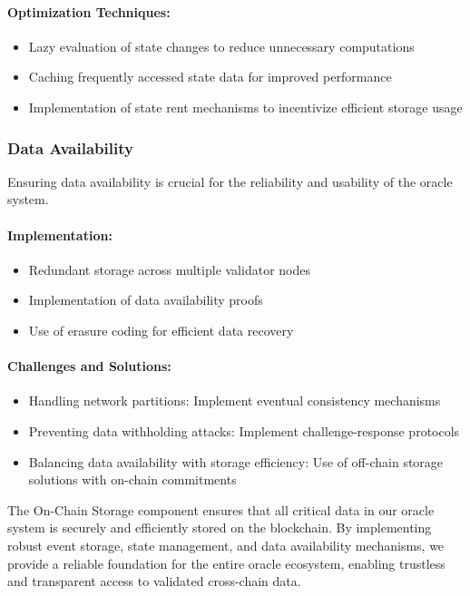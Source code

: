 \documentclass[12pt,a4paper]{article}
\begin{document}
	\paragraph{Optimization Techniques:}
	\begin{itemize}
		\item Lazy evaluation of state changes to reduce unnecessary computations
		\item Caching frequently accessed state data for improved performance
		\item Implementation of state rent mechanisms to incentivize efficient storage usage
	\end{itemize}
	
	\subsubsection{Data Availability}
	Ensuring data availability is crucial for the reliability and usability of the oracle system.
	
	\paragraph{Implementation:}
	\begin{itemize}
		\item Redundant storage across multiple validator nodes
		\item Implementation of data availability proofs
		\item Use of erasure coding for efficient data recovery
	\end{itemize}
	
	\paragraph{Challenges and Solutions:}
	\begin{itemize}
		\item Handling network partitions: Implement eventual consistency mechanisms
		\item Preventing data withholding attacks: Implement challenge-response protocols
		\item Balancing data availability with storage efficiency: Use of off-chain storage solutions with on-chain commitments
	\end{itemize}
	
	The On-Chain Storage component ensures that all critical data in our oracle system is securely and efficiently stored on the blockchain. By implementing robust event storage, state management, and data availability mechanisms, we provide a reliable foundation for the entire oracle ecosystem, enabling trustless and transparent access to validated cross-chain data.
	
\end{document}

